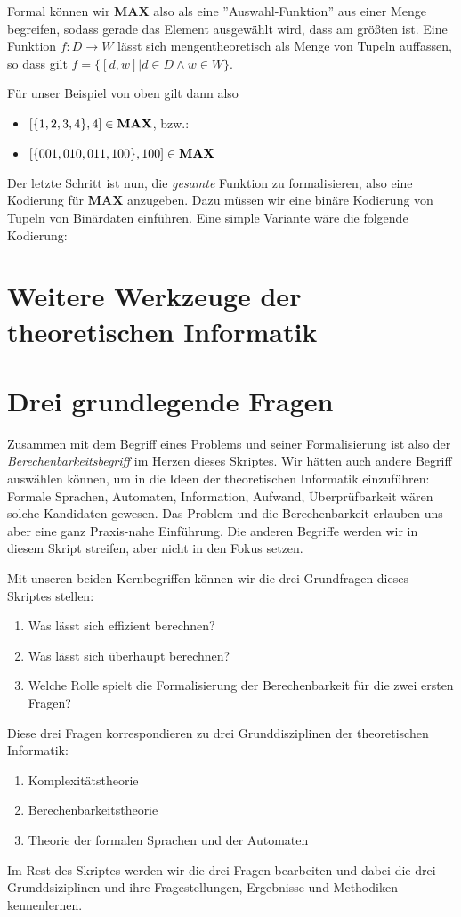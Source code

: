 Formal können wir \textbf{MAX} also als eine ''Auswahl-Funktion'' aus einer Menge begreifen,
sodass gerade das Element ausgewählt wird, dass am größten ist.
Eine Funktion $f: D \rightarrow W$ lässt sich mengentheoretisch als Menge von Tupeln auffassen,
so dass gilt $f = \{[d,w]|d \in D \wedge w \in W\}$.
 
\noindent
Für unser Beispiel von oben gilt dann also
\begin{itemize}
    \item $[\{1,2,3,4\},4] \in \bf{MAX}$, bzw.:
    \item $[\{001, 010, 011, 100\}, 100] \in \bf{MAX}$
\end{itemize}

Der letzte Schritt ist nun, die \emph{gesamte} Funktion zu formalisieren, also eine Kodierung
für \textbf{MAX} anzugeben.
Dazu müssen wir eine binäre Kodierung von Tupeln von Binärdaten einführen.
Eine simple Variante wäre die folgende Kodierung:

\section{Weitere Werkzeuge der theoretischen Informatik}

\section{Drei grundlegende Fragen}
Zusammen mit dem Begriff eines Problems und seiner Formalisierung ist also der
\emph{Berechenbarkeitsbegriff} im Herzen dieses Skriptes.
Wir hätten auch andere Begriff auswählen können, um in die Ideen der theoretischen Informatik einzuführen:
Formale Sprachen, Automaten, Information, Aufwand, Überprüfbarkeit wären solche Kandidaten gewesen.
Das Problem und die Berechenbarkeit erlauben uns aber eine ganz Praxis-nahe Einführung.
Die anderen Begriffe werden wir in diesem Skript streifen, aber nicht in den Fokus setzen.

Mit unseren beiden Kernbegriffen können wir die drei Grundfragen dieses Skriptes stellen:
\begin{enumerate}
    \item Was lässt sich effizient berechnen?
    \item Was lässt sich überhaupt berechnen?
    \item Welche Rolle spielt die Formalisierung der Berechenbarkeit für die zwei ersten Fragen?
\end{enumerate}

Diese drei Fragen korrespondieren zu drei Grunddisziplinen der theoretischen Informatik:
\begin{enumerate}
    \item Komplexitätstheorie
    \item Berechenbarkeitstheorie
    \item Theorie der formalen Sprachen und der Automaten
\end{enumerate}

Im Rest des Skriptes werden wir die drei Fragen bearbeiten und
dabei die drei Grunddsiziplinen und ihre Fragestellungen, Ergebnisse und Methodiken kennenlernen.
